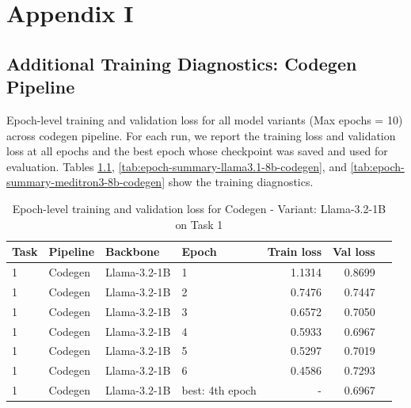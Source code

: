 \chapter{Appendix I}
\label{sec:appendix}

\section{Additional Training Diagnostics: Codegen Pipeline}
\label{app:training-diagnostics-codegen}
Epoch-level training and validation loss for all model variants (Max epochs = 10) across codegen pipeline. For each run, we report the training loss and validation loss at all epochs and the best epoch whose checkpoint was saved and used for evaluation.
Tables \ref{tab:epoch-summary-llama3.2-1b-codegen}, \ref{tab:epoch-summary-llama3.1-8b-codegen}, and \ref{tab:epoch-summary-meditron3-8b-codegen} show the training diagnostics.

\begin{table}[t]
    \centering
    \caption{Epoch-level training and validation loss for Codegen - Variant: Llama-3.2-1B on Task 1}
    \label{tab:epoch-summary-llama3.2-1b-codegen}
    \begin{tabular}{llllrrr}
        \toprule
        Task & Pipeline & Backbone & Epoch & Train loss & Val loss \\
        \midrule
        1 & Codegen & Llama-3.2-1B   & 1   & 1.1314 & 0.8699 \\
        1 & Codegen & Llama-3.2-1B   & 2   & 0.7476 & 0.7447 \\
        1 & Codegen & Llama-3.2-1B   & 3   & 0.6572 & 0.7050 \\
        1 & Codegen & Llama-3.2-1B   & 4   & 0.5933 & 0.6967 \\
        1 & Codegen & Llama-3.2-1B   & 5   & 0.5297 & 0.7019 \\
        1 & Codegen & Llama-3.2-1B   & 6   & 0.4586 & 0.7293 \\
        \midrule
        1 & Codegen & Llama-3.2-1B   & best: 4th epoch & - & 0.6967 \\
        \bottomrule
    \end{tabular}
\end{table}

